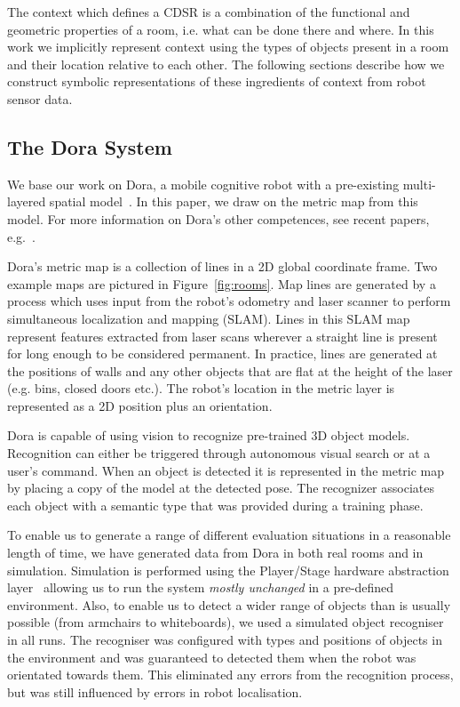 \documentclass[letterpaper]{article}
\begin{document}
The context which defines a CDSR is a combination of the functional and geometric properties of a room, i.e. what can be done there and where. In this work we implicitly represent context using the types of objects present in a room and their location relative to each other. The following sections describe how we construct symbolic representations of these ingredients of context from robot sensor data. 

\subsection{The Dora System}

We base our work on Dora, a mobile cognitive robot with a pre-existing multi-layered spatial model~\cite{Hawes/etal:2011}. In this paper, we draw on the metric map from this model. For more information on Dora's other competences, see recent papers, e.g.~\cite{Hawes/etal:2011,Hanheide/etal:2011}.

Dora's metric map is a collection of lines in a 2D global coordinate frame. Two example maps are pictured in Figure~\ref{fig:rooms}. Map lines are generated by a process which uses input from the robot's odometry and laser scanner to perform simultaneous localization and mapping (SLAM). Lines in this SLAM map represent features extracted from laser scans wherever a straight line is present for long enough to be considered permanent. In practice, lines are generated at the positions of walls and any other objects that are flat at the height of the laser (e.g. bins, closed doors etc.). The robot's location in the metric layer is represented as a 2D position plus an orientation. 

Dora is capable of using vision to recognize pre-trained 3D object models. Recognition can either be triggered through autonomous visual search or at a user's command. When an object is detected it is represented in the metric map 
by placing a copy of the model at the detected pose. The recognizer associates each object with a semantic type that was provided during a training phase.

To enable us to generate a range of different evaluation situations in a reasonable length of time, we have generated data from Dora in both real rooms and in simulation. Simulation is performed using the Player/Stage hardware abstraction layer~\cite{GerkeyVaughanHoward03} allowing us to run the system \emph{mostly unchanged} in a pre-defined environment. Also, to enable us to detect a wider range of objects than is usually possible (from armchairs to whiteboards), we used a simulated object recogniser in all runs. The recogniser was configured with types and positions of objects in the environment and was guaranteed to detected them when the robot was orientated towards them. This eliminated any errors from the recognition process, but was still influenced by errors in robot localisation.
\end{document}
